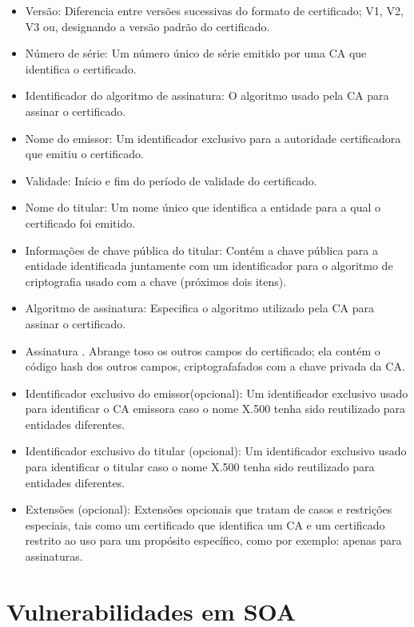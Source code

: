  \begin{itemize}

\item Versão: Diferencia entre versões sucessivas do formato de certificado; V1, V2, V3 ou, designando a versão padrão do certificado.

\item Número de série: Um número único de série emitido por uma CA que identifica o certificado.
\item Identificador do algoritmo de assinatura: O algoritmo usado pela CA para assinar o certificado.
\item Nome do emissor: Um identificador exclusivo para a autoridade certificadora que emitiu o certificado.
\item Validade: Início e fim do período de validade do certificado.
\item Nome do titular:  Um nome único que identifica a entidade para a qual o certificado foi emitido.
\item Informações de chave pública do titular: Contém a chave pública para a entidade identificada juntamente com um identificador para o algoritmo de criptografia usado com a chave (próximos dois itens).
\item Algoritmo de assinatura: Especifica o algoritmo utilizado pela CA para assinar o certificado.
\item Assinatura . Abrange toso os outros campos do certificado; ela contém o código hash dos outros campos, criptografafados com a chave privada da CA.
\item Identificador exclusivo do emissor(opcional): Um identificador exclusivo usado para identificar o CA emissora caso o nome X.500 tenha sido reutilizado para entidades diferentes.
\item Identificador exclusivo do titular (opcional): Um identificador exclusivo usado para identificar o titular caso o nome X.500 tenha sido reutilizado para entidades diferentes.
\item Extensões (opcional): Extensões opcionais que tratam de casos e restrições especiais, tais como um certificado que identifica um CA e um certificado restrito ao uso para um propósito específico, como por exemplo: apenas para assinaturas.

\end{itemize}




\section{Vulnerabilidades em SOA}\label{sec:vulnerabilidadessoa}

